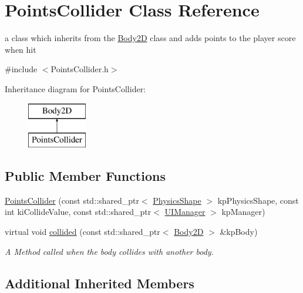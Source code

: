 \hypertarget{class_points_collider}{\section{Points\+Collider Class Reference}
\label{class_points_collider}
}


a class which inherits from the \hyperlink{class_body2_d}{Body2\+D} class and adds points to the player score when hit  




{\ttfamily \#include $<$Points\+Collider.\+h$>$}

Inheritance diagram for Points\+Collider\+:\begin{figure}[H]
\begin{center}
\leavevmode
\includegraphics[height=2.000000cm]{class_points_collider}
\end{center}
\end{figure}
\subsection*{Public Member Functions}
\begin{DoxyCompactItemize}
\item 
\hyperlink{class_points_collider_ad51a37d4026b09b8efef51e0098602aa}{Points\+Collider} (const std\+::shared\+\_\+ptr$<$ \hyperlink{class_physics_shape}{Physics\+Shape} $>$ kp\+Physics\+Shape, const int ki\+Collide\+Value, const std\+::shared\+\_\+ptr$<$ \hyperlink{class_u_i_manager}{U\+I\+Manager} $>$ kp\+Manager)
\item 
virtual void \hyperlink{class_points_collider_ad24d2f1ba11e34a52e9caef300239de6}{collided} (const std\+::shared\+\_\+ptr$<$ \hyperlink{class_body2_d}{Body2\+D} $>$ \&kp\+Body)
\begin{DoxyCompactList}\small\item\em A Method called when the body collides with another body. \end{DoxyCompactList}\end{DoxyCompactItemize}
\subsection*{Additional Inherited Members}


